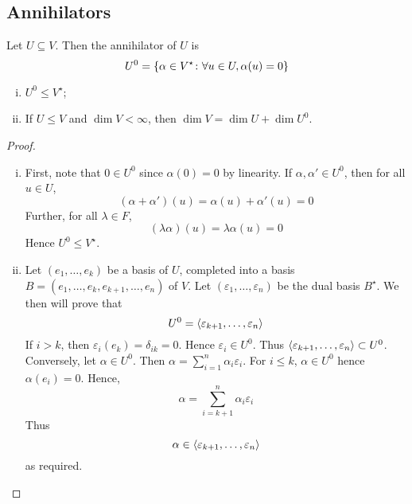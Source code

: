 \subsection{Annihilators}
\begin{definition}
	Let \( U \subseteq V \).
	Then the annihilator of \( U \) is
	\[ U^0 = \qty{\alpha \in V^\star \colon \forall u \in U, \alpha(u) = 0} \]
\end{definition}
\begin{lemma}
	\begin{enumerate}[(i)]
		\item \( U^0 \leq V^\star \);
		\item If \( U \leq V \) and \( \dim V < \infty \), then \( \dim V = \dim U + \dim U^0 \).
	\end{enumerate}
\end{lemma}
\begin{proof}
	\begin{enumerate}[(i)]
		\item First, note that \( 0 \in U^0 \) since \( \alpha(0) = 0 \) by linearity.
			If \( \alpha, \alpha' \in U^0 \), then for all \( u \in U \),
			\[ (\alpha + \alpha')(u) = \alpha(u) + \alpha'(u) = 0 \]
			Further, for all \( \lambda \in F \),
			\[ (\lambda \alpha)(u) = \lambda \alpha(u) = 0 \]
			Hence \( U^0 \leq V^\star \).
		\item Let \( (e_1, \dots, e_k) \) be a basis of \( U \), completed into a basis \( B = (e_1, \dots, e_k, e_{k+1}, \dots, e_n) \) of \( V \).
			Let \( (\varepsilon_1, \dots, \varepsilon_n) \) be the dual basis \( B^\star \).
			We then will prove that
			\[ U^0 = \langle{} \varepsilon_{k+1}, \dots, \varepsilon_n \rangle \]
			If \( i > k \), then \( \varepsilon_i(e_k) = \delta_{ik} = 0 \).
			Hence \( \varepsilon_i \in U^0 \).
			Thus \( \langle{} \varepsilon_{k+1}, \dots, \varepsilon_n \rangle \subset U^0 \).
			Conversely, let \( \alpha \in U^0 \).
			Then \( \alpha = \sum_{i=1}^n \alpha_i \varepsilon_i \).
			For \( i \leq k \), \( \alpha \in U^0 \) hence \( \alpha(e_i) = 0 \).
			Hence,
			\[ \alpha = \sum_{i=k+1}^n \alpha_i \varepsilon_i \]
			Thus
			\[ \alpha \in \langle{} \varepsilon_{k+1}, \dots, \varepsilon_n \rangle \]
			as required.
	\end{enumerate}
\end{proof}

